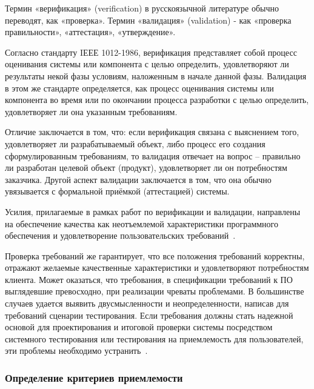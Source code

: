 \documentclass{../industrial-development}
\begin{document}
{\begin{frame}
\end{frame}
\lecturenotes

Термин \alert{«верификация» (verification)} в русскоязычной литературе обычно
переводят, как «проверка». Термин \alert{«валидация» (validation)} - как «проверка правильности», «аттестация», «утверждение».

Согласно стандарту IЕЕЕ 1012-1986, верификация представляет собой процесс оценивания системы или компонента с целью определить, удовлетворяют ли
результаты некой фазы условиям, наложенным в начале данной фазы. Валидация в этом
же стандарте определяется, как процесс оценивания системы или компонента во время
или по окончании процесса разработки с целью определить, удовлетворяет ли она
указанным требованиям.

Отличие заключается в том, что: если
верификация связана с выяснением того, удовлетворяет ли разрабатываемый объект, либо
процесс его создания сформулированным требованиям, то валидация отвечает на вопрос –
правильно ли разработан целевой объект (продукт), удовлетворяет ли он потребностям
заказчика. Другой аспект валидации заключается в том, что она обычно увязывается с
формальной приёмкой (аттестацией) системы.

Усилия, прилагаемые в рамках
работ по верификации и валидации, направлены на обеспечение качества как
неотъемлемой характеристики программного обеспечения и удовлетворение
пользовательских требований~\cite[с.~64--65]{Maglinec}.

Проверка требований же гарантирует, что все положения требований корректны, отражают желаемые качественные характеристики и удовлетворяют потребностям клиента. Может оказаться, что требования, в спецификации требований к ПО выглядевшие превосходно, при реализации чреваты проблемами. В большинстве случаев удается выявить двусмысленности и неопределенности, написав для требований сценарии тестирования. Если требования должны стать надежной основой для проектирования и итоговой проверки системы посредством системного тестирования или тестирования на приемлемость для пользователей, эти проблемы необходимо устранить~\cite[с.~51]{Wiegers}.

\begin{frame} \frametitle {Определение критериев
приемлемости}


\end{frame}}
\end{document}
